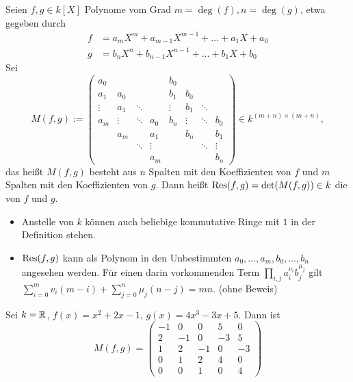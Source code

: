 \begin{defn}[Resultante]
\label{def_10.5}
	Seien $f,g \in k[X]$ Polynome vom Grad $m = \deg(f), n=\deg(g)$, etwa gegeben durch
	\begin{equation}
	\begin{aligned}
		f &= a_mX^m + a_{m-1}X^{m-1} + \dots + a_1X + a_0 \\
		g &= b_nX^n + b_{n-1}X^{n-1} + \dots + b_1X + b_0
	\end{aligned}
	\end{equation}
	Sei
	\[ M(f,g) := \begin{pmatrix}
	a_0 &  &  &  & b_0 &  &  &  \\ 
	a_1 & a_0 &  &  & b_1 & b_0 &  &  \\ 
	\vdots & a_1 & \ddots &  & \vdots & b_1 & \ddots &  \\ 
	a_m & \vdots & \ddots & a_0 & b_n & \vdots & \ddots & b_0 \\ 
	 & a_m &  & a_1 &  & b_n &  & b_1 \\ 
	 &  & \ddots & \vdots &  &  & \ddots & \vdots \\ 
	 &  &  & a_m &  &  &  & b_n
	\end{pmatrix} \in k^{(m+n) \times (m+n)},\]
	das heißt $M(f,g)$ besteht aus $n$ Spalten mit den Koeffizienten von $f$ und $m$ Spalten mit den Koeffizienten von $g$. Dann heißt $\operatorname{Res}(f,g) = \det(M(f,g)) \in k$ die  von $f$ und $g$.
\end{defn}

\begin{bem}
\label{bem_10.6}
	\begin{itemize}
		\item Anstelle von $k$ können auch beliebige kommutative Ringe mit $1$ in der Definition stehen.
		\item $\operatorname{Res}(f,g)$ kann als Polynom in den Unbestimmten $a_0,\dots,a_m, b_0, \dots, b_n$ angesehen werden. Für einen darin vorkommenden Term $\prod_{i,j} a_i^{\nu_i} b_j^{\mu_j}$ gilt $\sum_{i=0}^{m} v_i (m-i) + \sum_{j=0}^{n} \mu_j (n-j) = mn$. (ohne Beweis)
	\end{itemize}
\end{bem}

\begin{bsp}
	Sei $k = \mathbb{R}$, $f(x) = x^2+2x-1$, $g(x) = 4x^3 - 3x + 5$. Dann ist
	\[
		M(f,g) = \begin{pmatrix}
		-1 & 0 & 0 & 5 & 0 \\ 
		2 & -1 & 0 & -3 & 5 \\ 
		1 & 2 & -1 & 0 & -3 \\ 
		0 & 1 & 2 & 4 & 0 \\ 
		0 & 0 & 1 & 0 & 4
		\end{pmatrix} 
	\]
\end{bsp}

